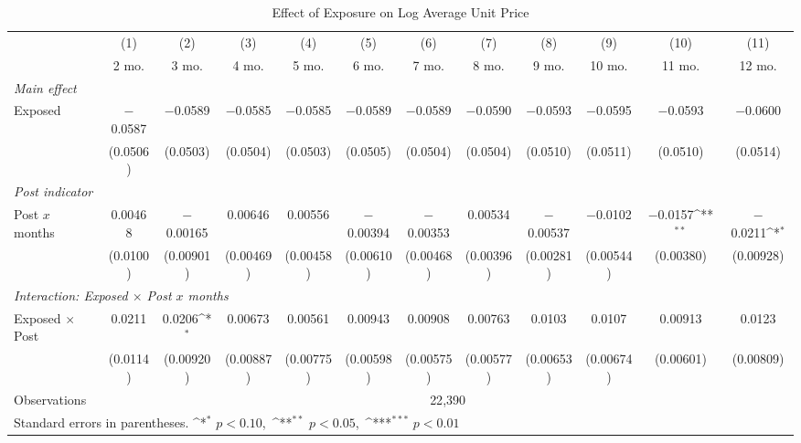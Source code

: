 \begin{table}[htbp]
\centering
\def\sym#1{\ifmmode^{#1}\else\(^{#1}\)\fi}
\caption{Effect of Exposure on Log Average Unit Price}
\begin{tabular}{l*{11}{c}}
\toprule
 & (1) & (2) & (3) & (4) & (5) & (6) & (7) & (8) & (9) & (10) & (11) \\
 & \small 2 mo. & \small 3 mo. & \small 4 mo. & \small 5 mo. & \small 6 mo. 
 & \small 7 mo. & \small 8 mo. & \small 9 mo. & \small 10 mo. & \small 11 mo. & \small 12 mo. \\
\midrule

\multicolumn{12}{l}{\textit{Main effect}} \\[2pt]
\quad Exposed          
  & $-$0.0587 & $-$0.0589 & $-$0.0585 & $-$0.0585 & $-$0.0589
  & $-$0.0589 & $-$0.0590 & $-$0.0593 & $-$0.0595 & $-$0.0593 & $-$0.0600 \\
  & (0.0506) & (0.0503) & (0.0504) & (0.0503) & (0.0505)
  & (0.0504) & (0.0504) & (0.0510) & (0.0511) & (0.0510) & (0.0514) \\[6pt]

\multicolumn{12}{l}{\textit{Post indicator}} \\[2pt]
\quad Post $x$ months  
  & 0.00468 & $-$0.00165 & 0.00646 & 0.00556 & $-$0.00394
  & $-$0.00353 & 0.00534 & $-$0.00537 & $-$0.0102 & $-$0.0157\sym{**} & $-$0.0211\sym{*} \\
  & (0.0100) & (0.00901) & (0.00469) & (0.00458) & (0.00610)
  & (0.00468) & (0.00396) & (0.00281) & (0.00544) & (0.00380) & (0.00928) \\[6pt]

\multicolumn{12}{l}{\textit{Interaction: Exposed $\times$ Post $x$ months}} \\[2pt]
\quad Exposed $\times$ Post  
  & 0.0211 & 0.0206\sym{*} & 0.00673 & 0.00561 & 0.00943
  & 0.00908 & 0.00763 & 0.0103 & 0.0107 & 0.00913 & 0.0123 \\
  & (0.0114) & (0.00920) & (0.00887) & (0.00775) & (0.00598)
  & (0.00575) & (0.00577) & (0.00653) & (0.00674) & (0.00601) & (0.00809) \\

\midrule
Observations & \multicolumn{11}{c}{22{,}390} \\
\bottomrule
\multicolumn{12}{l}{\footnotesize Standard errors in parentheses.
  \sym{*} $p<0.10$,\ \sym{**} $p<0.05$,\ \sym{***} $p<0.01$}\\
\end{tabular}
\end{table}